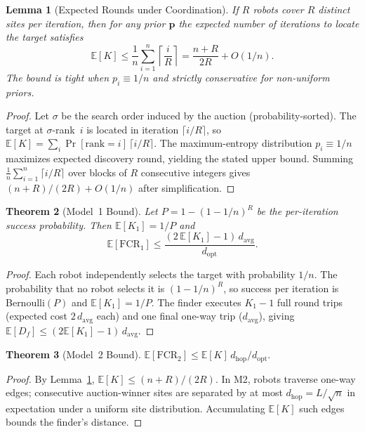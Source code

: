 \documentclass[conference]{IEEEtran}
\newtheorem{theorem}{Theorem}
\newtheorem{lemma}[theorem]{Lemma}
\begin{document}
\begin{lemma}[Expected Rounds under Coordination]\label{lem:rounds}
If $R$ robots cover $R$ distinct sites per iteration, then for any prior
$\mathbf{p}$ the expected number of iterations to locate the target satisfies
\[
  \mathbb{E}[K] \leq \frac{1}{n}\sum_{i=1}^{n}\!\left\lceil\frac{i}{R}\right\rceil
  = \frac{n+R}{2R} + O(1/n).
\]
The bound is tight when $p_i \equiv 1/n$ and strictly conservative for
non-uniform priors.
\end{lemma}
\begin{proof}
Let $\sigma$ be the search order induced by the auction (probability-sorted).
The target at $\sigma$-rank~$i$ is located in iteration $\lceil i/R \rceil$,
so $\mathbb{E}[K] = \sum_{i} \Pr[\text{rank} = i]\,\lceil i/R \rceil$.
The maximum-entropy distribution $p_i \equiv 1/n$ maximizes expected
discovery round, yielding the stated upper bound.
Summing $\frac{1}{n}\sum_{i=1}^n \lceil i/R \rceil$ over blocks of $R$
consecutive integers gives $(n+R)/(2R) + O(1/n)$ after simplification.
\end{proof}

\begin{theorem}[Model~1 Bound]\label{thm:m1}
Let $P = 1-(1-1/n)^{R}$ be the per-iteration success probability.
Then $\mathbb{E}[K_1] = 1/P$ and
\begin{equation}
  \mathbb{E}[\mathrm{FCR}_1] \leq
  \frac{(2\,\mathbb{E}[K_1]-1)\,d_{\mathrm{avg}}}{d_{\mathrm{opt}}}.
\end{equation}
\end{theorem}
\begin{proof}
Each robot independently selects the target with probability $1/n$.
The probability that no robot selects it is $(1-1/n)^R$, so success per
iteration is Bernoulli$(P)$ and $\mathbb{E}[K_1] = 1/P$.
The finder executes $K_1-1$ full round trips (expected cost $2\,d_{\mathrm{avg}}$
each) and one final one-way trip ($d_{\mathrm{avg}}$), giving
$\mathbb{E}[D_f] \leq (2\mathbb{E}[K_1]-1)\,d_{\mathrm{avg}}$.
\end{proof}

\begin{theorem}[Model~2 Bound]\label{thm:m2}
$\mathbb{E}[\mathrm{FCR}_2] \leq \mathbb{E}[K]\,d_{\mathrm{hop}}/d_{\mathrm{opt}}.$
\end{theorem}
\begin{proof}
By Lemma~\ref{lem:rounds}, $\mathbb{E}[K] \leq (n+R)/(2R)$.
In M2, robots traverse one-way edges; consecutive auction-winner sites are
separated by at most $d_{\mathrm{hop}} = L/\sqrt{n}$ in expectation under
a uniform site distribution.
Accumulating $\mathbb{E}[K]$ such edges bounds the finder's distance.
\end{proof}
\end{document}
